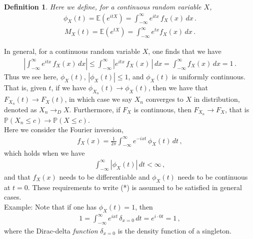 \documentclass[11pt, onesided]{book}
\theoremstyle{break}
\theoremstyle{break}
\newtheorem{defn}{Definition}[thm]
\newcommand{\example}{\color{green}Example: \color{black}}
\begin{document}
\begin{defn}
Here we define, for a continuous random variable $X$,
\begin{align*}
\phi_X(t) = \mathbb{E}(e^{itX}) = \int_{-\infty}^{\infty}e^{itx}\, f_X(x) \, dx\,.
\end{align*}
\begin{align*}
M_X(t) = \mathbb{E}(e^{tX}) = \int_{-\infty}^\infty e^{tx} f_X(x) \, dx\,.
\end{align*}
\end{defn}
In general, for a continuous random variable $X$, one finds that we have
\begin{align*}
\left|  \int_{-\infty}^{\infty}e^{itx}\, f_X(x) \, dx\right| \leq  \int_{-\infty}^{\infty} \left|e^{itx}\, f_X(x)\,\right| \, dx = \int_{-\infty}^\infty f_X(x) \, dx = 1\,.
\end{align*}
Thus we see here, $\phi_X(t)$, $|\phi_X(t)| \leq 1$, and $\phi_X(t)$ is uniformly continuous. That is, given $t$, if we have $\phi_{X_n}(t) \to \phi_X(t)$, then we have that $F_{X_n}(t) \to F_X(t)$, in which case we say $X_n$ converges to $X$ in distribution, denoted as $X_n \to_D X$. Furthermore, if $F_X$ is continuous, then $F_{X_n} \to F_X$, that is $\mathbb{P}(X_n \leq c) \to \mathbb{P}(X\leq c)$. \\

Here we consider the Fourier inversion,
\begin{align}
f_X(x ) =\frac{1}{2\pi}\int_{-\infty}^\infty e^{-ixt}\, \phi_X(t) \, dt\,, \tag{*}
\end{align}
which holds when we have
\begin{align*}
\int_{-\infty}^\infty |\phi_X(t)| \,dt < \infty\,,
\end{align*}
and that $f_X(x)$ needs to be differentiable and $\phi_X(t)$ needs to be continuous at $t = 0$. These requirements to write (*) is assumed to be satisfied in general cases.\\

\example Note that if one has $\phi_X(t) = 1$, then 
\begin{align*}
1 = \int_{-\infty}^\infty e^{ixt}\, \delta_{x=0}\, dt = e^{i\cdot 0 t} = 1\,,
\end{align*}
where the Dirac-delta \textit{function} $\delta_{x=0}$ is the density function of a singleton. \\
\end{document}

